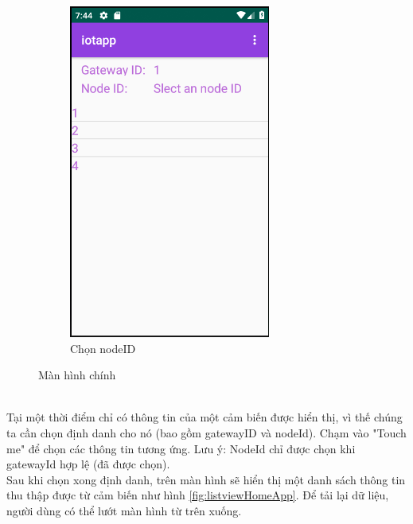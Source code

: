 \documentclass[a4paper]{article}
\begin{document}
\begin{enumerate}
\begin{figure}[!tbp]
\begin{subfigure}[b]{0.3\textwidth}
    \includegraphics[width=\textwidth]{SelectnodeID.png}
    \caption{Chọn nodeID}
    \label{fig:SelectnodeIDApp}
  \end{subfigure}
  \caption{Màn hình chính}
 \end{figure}\\
	Tại một thời điểm chỉ có thông tin của một cảm biến được hiển thị, vì thế chúng ta cần chọn định danh cho nó (bao gồm gatewayID 	và nodeId). Chạm vào "Touch me" để chọn các thông tin tương ứng. Lưu ý: NodeId chỉ được chọn khi gatewayId hợp lệ (đã được 	chọn).\\
	Sau khi chọn xong định danh, trên màn hình sẽ hiển thị một danh sách thông tin thu thập được từ cảm biến như hình \ref{fig:listviewHomeApp}. Để tải lại dữ liệu, người dùng có thể lướt màn hình từ trên xuống.\\


\end{enumerate}
\end{document}
